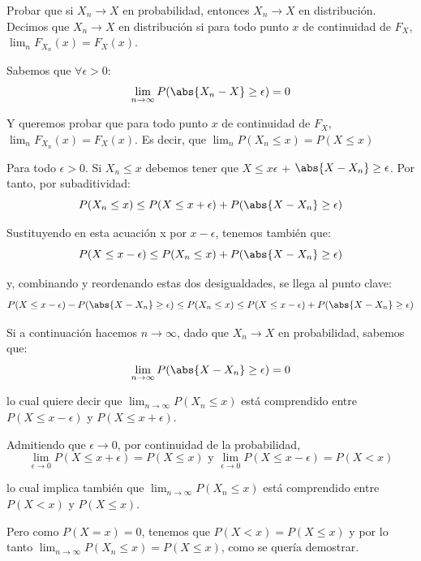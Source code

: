\begin{problem}[4]Probar que si $X_n\to  X$ en  probabilidad, entonces $X_n\to  X$ en distribuci\'on. Decimos que
 $X_n\to  X$ en distribuci\'on si para todo punto $x$ de continuidad de $F_X$, $\lim_n F_{X_n} (x) = F_X (x)$.
\solution


Sabemos que $\forall \epsilon > 0$: 
\[
\lim_{n \rightarrow \infty} P(\abs{X_n -X}\geq \epsilon) = 0
\]

Y queremos probar que para todo punto $x$ de continuidad de $F_X$, $\lim_n F_{X_n} (x) = F_X (x)$. Es decir, que $\lim_n P(X_n \leq x) = P(X \leq x)$

Para todo $\epsilon > 0$. Si $X_n \leq x$ debemos tener que $X \leq x \epsilon$ +  $\abs{X-X_n}\geq \epsilon$. Por tanto, por subaditividad:
\[
P(X_n \leq x) \leq P(X \leq x + \epsilon)+P(\abs{X-X_n}\geq \epsilon)
\]

Sustituyendo en esta acuación x por $x-\epsilon$, tenemos también que:
\[
P(X \leq x - \epsilon) \leq P(X_n \leq x) + P(\abs{X-X_n} \geq \epsilon)
\]

y, combinando y reordenando estas dos desigualdades, se llega al punto clave:
\[
P(X \leq x - \epsilon)-P(\abs{X-X_n}\geq \epsilon) \leq P(X_n \leq x) \leq P(X \leq x - \epsilon)+P(\abs{X-X_n}\geq \epsilon)
\]

Si a continuación hacemos $n \rightarrow \infty$, dado que $X_n \rightarrow X$ en probabilidad, sabemos que:
\[
\lim_{n \rightarrow \infty} P(\abs{X-X_n}\geq \epsilon)=0
\]

lo cual quiere decir que $\lim_{n \rightarrow \infty} P(X_n \leq x)$ está comprendido entre $P(X \leq x - \epsilon)$ y $P(X \leq x + \epsilon)$.

Admitiendo que $\epsilon \rightarrow 0$, por continuidad de la probabilidad,
\[
\lim_{\epsilon \rightarrow 0} P (X \leq x + \epsilon) = P(X \leq x) \text{ y } \lim_{\epsilon \rightarrow 0} P (X \leq x - \epsilon) = P(X < x)
\]
 
lo cual implica también que $\lim_{n \rightarrow \infty} P(X_n \leq x)$ está comprendido entre $P(X<x)$ y $P(X \leq x)$.

Pero como $P(X=x)=0$, tenemos que $P(X<x)=P(X \leq x)$ y por lo tanto  $\lim_{n \rightarrow \infty} P(X_n \leq x) = P(X \leq x)$, como se quería demostrar.

\end{problem}


